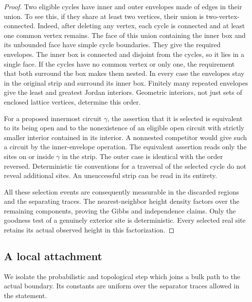 \documentclass[11pt]{article}
\theoremstyle{definition}
\theoremstyle{remark}
\numberwithin{equation}{section}
\begin{document}
\begin{proof}
Two eligible cycles have inner and outer envelopes made of edges in
their union.  To see this, if they share at least two vertices, their
union is two-vertex-connected.  Indeed, after deleting any vertex,
each cycle is connected and at least one common vertex remains.
The face of this union containing the inner box and its unbounded
face have simple cycle boundaries.  They give the required
envelopes.  The inner box is connected and disjoint from the cycles,
so it lies in a single face.  If the cycles have no common vertex or
only one, the requirement that both surround the box makes them
nested.  In every case the envelopes stay in the original strip
and surround its inner box.  Finitely many repeated envelopes give
the least and greatest Jordan interiors.  Geometric interiors, not
just sets of enclosed lattice vertices, determine this order.

For a proposed innermost circuit $\gamma$, the assertion that it is
selected is equivalent to its being open and to the nonexistence of
an eligible open circuit with strictly smaller interior contained
in its interior.  A nonnested competitor would give such a circuit
by the inner-envelope operation.  The equivalent assertion reads
only the sites on or inside $\gamma$ in the strip.  The outer case
is identical with the order reversed.  Deterministic tie conventions
for a traversal of the selected cycle do not reveal additional
sites.  An unsuccessful strip can be read in its entirety.

All these selection events are consequently measurable in the
discarded regions and the separating traces.  The nearest-neighbor
height density factors over the remaining components, proving the
Gibbs and independence claims.  Only the goodness test of a genuinely
exterior site is deterministic.  Every selected real site retains
its actual observed height in this factorization.
\end{proof}

\subsection{A local attachment}

We isolate the probabilistic and topological step which joins a bulk
path to the actual boundary.  Its constants are uniform over the
separator traces allowed in the statement.
\end{document}
